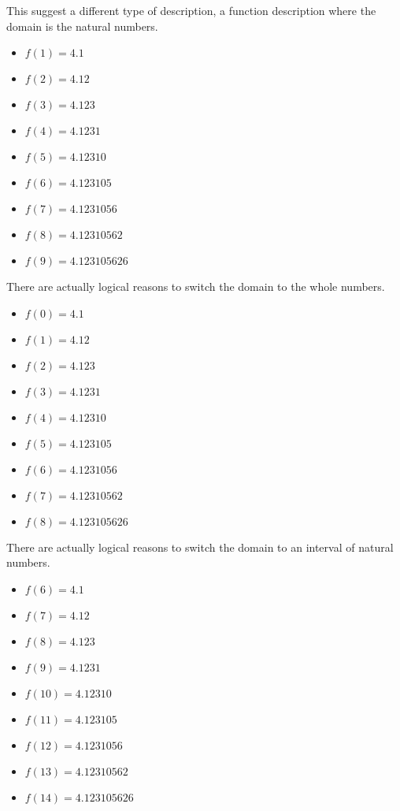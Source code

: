 \documentclass{ximera}
\begin{document}
This suggest a different type of description, a function description where the domain is the natural numbers.



\begin{itemize}
\item $f(1) = 4.1$
\item $f(2) = 4.12$
\item $f(3) = 4.123$
\item $f(4) = 4.1231$
\item $f(5) = 4.12310$
\item $f(6) = 4.123105$
\item $f(7) = 4.1231056$
\item $f(8) = 4.12310562$
\item $f(9) = 4.123105626$
\end{itemize}



There are actually logical reasons to switch the domain to the whole numbers.





\begin{itemize}
\item $f(0) = 4.1$
\item $f(1) = 4.12$
\item $f(2) = 4.123$
\item $f(3) = 4.1231$
\item $f(4) = 4.12310$
\item $f(5) = 4.123105$
\item $f(6) = 4.1231056$
\item $f(7) = 4.12310562$
\item $f(8) = 4.123105626$
\end{itemize}




There are actually logical reasons to switch the domain to an interval of natural numbers.





\begin{itemize}
\item $f(6) = 4.1$
\item $f(7) = 4.12$
\item $f(8) = 4.123$
\item $f(9) = 4.1231$
\item $f(10) = 4.12310$
\item $f(11) = 4.123105$
\item $f(12) = 4.1231056$
\item $f(13) = 4.12310562$
\item $f(14) = 4.123105626$
\end{itemize}
\end{document}
